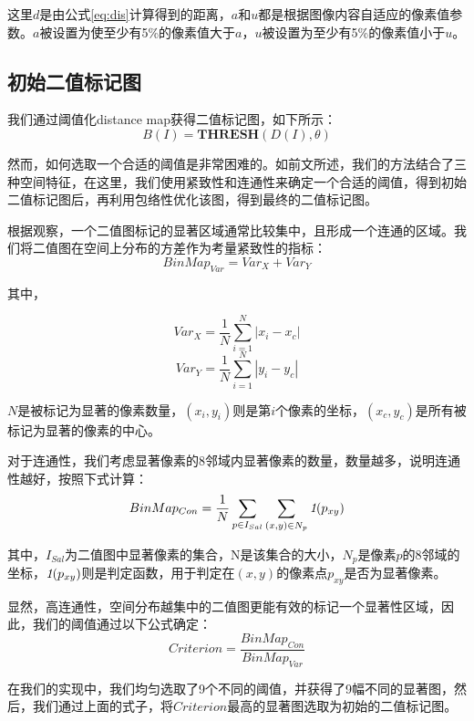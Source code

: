 这里$d$是由公式\ref{eq:dis}计算得到的距离，$a$和$u$都是根据图像内容自适应的像素值参数。$a$被设置为使至少有5\%的像素值大于$a$，$u$被设置为至少有5\%的像素值小于$u$。

\subsection{初始二值标记图}
我们通过阈值化distance map获得二值标记图，如下所示：
\begin{equation}
B(I)= \textbf{THRESH}(D(I), \theta)
\end{equation}

然而，如何选取一个合适的阈值是非常困难的。如前文所述，我们的方法结合了三种空间特征，在这里，我们使用紧致性和连通性来确定一个合适的阈值，得到初始二值标记图后，再利用包络性优化该图，得到最终的二值标记图。

根据观察，一个二值图标记的显著区域通常比较集中，且形成一个连通的区域。我们将二值图在空间上分布的方差作为考量紧致性的指标：
\begin{equation}
BinMap_{Var} = Var_X + Var_Y
\end{equation}

其中，

\begin{equation}
Var_X = \frac{1}{N} \sum_{i=1}^N |x_i-x_c|
\end{equation}
\begin{equation}
Var_Y = \frac{1}{N} \sum_{i=1}^N |y_i-y_c|
\end{equation}

$N$是被标记为显著的像素数量，$(x_i,y_i)$则是第$i$个像素的坐标，$(x_c,y_c)$是所有被标记为显著的像素的中心。

对于连通性，我们考虑显著像素的8邻域内显著像素的数量，数量越多，说明连通性越好，按照下式计算：
\begin{equation}
BinMap_{Con} = \frac{1}{N}\sum_{p\in I_{Sal}}\sum_{(x,y)\in N_p}\emph{1}(p_{xy})
\end{equation}

其中，$I_{Sal}$为二值图中显著像素的集合，N是该集合的大小，$N_p$是像素$p$的8邻域的坐标，$\emph{1}(p_{xy})$则是判定函数，用于判定在$(x,y)$的像素点$p_{xy}$是否为显著像素。

显然，高连通性，空间分布越集中的二值图更能有效的标记一个显著性区域，因此，我们的阈值通过以下公式确定：
\begin{equation}
Criterion = \frac{BinMap_{Con}}{BinMap_{Var}}
\end{equation}

在我们的实现中，我们均匀选取了9个不同的阈值，并获得了9幅不同的显著图，然后，我们通过上面的式子，将$Criterion$最高的显著图选取为初始的二值标记图。

